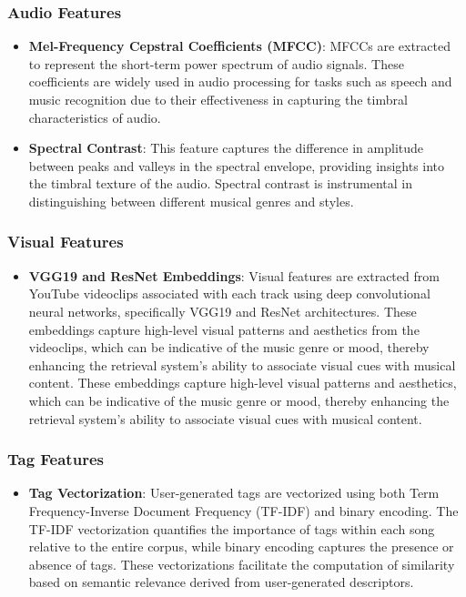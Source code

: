\documentclass[sigconf]{acmart}
\begin{document}
\subsubsection{Audio Features}

\begin{itemize}
    \item \textbf{Mel-Frequency Cepstral Coefficients (MFCC)}: MFCCs are extracted to represent the short-term power spectrum of audio signals. These coefficients are widely used in audio processing for tasks such as speech and music recognition due to their effectiveness in capturing the timbral characteristics of audio.
    
    \item \textbf{Spectral Contrast}: This feature captures the difference in amplitude between peaks and valleys in the spectral envelope, providing insights into the timbral texture of the audio. Spectral contrast is instrumental in distinguishing between different musical genres and styles.
\end{itemize}

\subsubsection{Visual Features}

\begin{itemize}
    \item \textbf{VGG19 and ResNet Embeddings}: Visual features are extracted from YouTube videoclips associated with each track using deep convolutional neural networks, specifically VGG19 and ResNet architectures. These embeddings capture high-level visual patterns and aesthetics from the videoclips, which can be indicative of the music genre or mood, thereby enhancing the retrieval system's ability to associate visual cues with musical content.
 These embeddings capture high-level visual patterns and aesthetics, which can be indicative of the music genre or mood, thereby enhancing the retrieval system's ability to associate visual cues with musical content.
\end{itemize}

\subsubsection{Tag Features}

\begin{itemize}
    \item \textbf{Tag Vectorization}: User-generated tags are vectorized using both Term Frequency-Inverse Document Frequency (TF-IDF) and binary encoding. The TF-IDF vectorization quantifies the importance of tags within each song relative to the entire corpus, while binary encoding captures the presence or absence of tags. These vectorizations facilitate the computation of similarity based on semantic relevance derived from user-generated descriptors.
\end{itemize}
\end{document}
